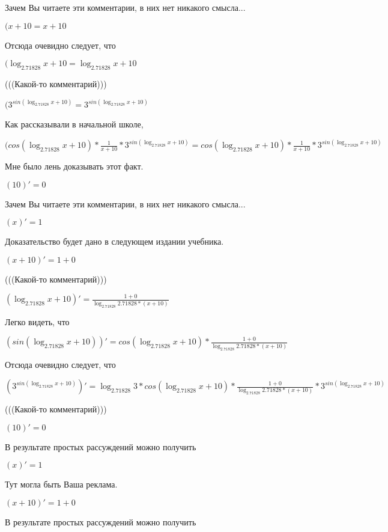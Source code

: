 \documentclass[12pt,a4paper,fleqn]{article}
\theoremstyle{definition}
\begin{document}
Зачем Вы читаете эти комментарии, в них нет никакого смысла...

$( x  +  10  =  x  +  10 $

Отсюда очевидно следует, что

$(\log_{ 2.71828 }{ x  +  10 } = \log_{ 2.71828 }{ x  +  10 }$

(((Какой-то комментарий)))

$({ 3 }^{sin(\log_{ 2.71828 }{ x  +  10 })} = { 3 }^{sin(\log_{ 2.71828 }{ x  +  10 })}$

Как рассказывали в начальной школе,

$(cos(\log_{ 2.71828 }{ x  +  10 }) * \frac{ 1 }{ x  +  10 }
 * { 3 }^{sin(\log_{ 2.71828 }{ x  +  10 })} = cos(\log_{ 2.71828 }{ x  +  10 }) * \frac{ 1 }{ x  +  10 }
 * { 3 }^{sin(\log_{ 2.71828 }{ x  +  10 })}$

Мне было лень доказывать этот факт.

$( 10 )' =  0 $

Зачем Вы читаете эти комментарии, в них нет никакого смысла...

$( x )' =  1 $

Доказательство будет дано в следующем издании учебника.

$( x  +  10 )' =  1  +  0 $

(((Какой-то комментарий)))

$(\log_{ 2.71828 }{ x  +  10 })' = \frac{ 1  +  0 }{\log_{ 2.71828 }{ 2.71828 } * ( x  +  10 )}
$

Легко видеть, что

$(sin(\log_{ 2.71828 }{ x  +  10 }))' = cos(\log_{ 2.71828 }{ x  +  10 }) * \frac{ 1  +  0 }{\log_{ 2.71828 }{ 2.71828 } * ( x  +  10 )}
$

Отсюда очевидно следует, что

$({ 3 }^{sin(\log_{ 2.71828 }{ x  +  10 })})' = \log_{ 2.71828 }{ 3 } * cos(\log_{ 2.71828 }{ x  +  10 }) * \frac{ 1  +  0 }{\log_{ 2.71828 }{ 2.71828 } * ( x  +  10 )}
 * { 3 }^{sin(\log_{ 2.71828 }{ x  +  10 })}$

(((Какой-то комментарий)))

$( 10 )' =  0 $

В результате простых рассуждений можно получить

$( x )' =  1 $

Тут могла быть Ваша реклама.

$( x  +  10 )' =  1  +  0 $

В результате простых рассуждений можно получить
\end{document}
